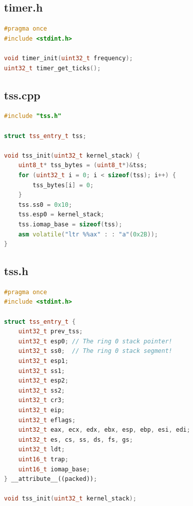 \documentclass[12pt,a4paper]{report}
\begin{document}
\subsection{timer.h}
\begin{lstlisting}[language={C++}]
#pragma once
#include <stdint.h>

void timer_init(uint32_t frequency);
uint32_t timer_get_ticks();
\end{lstlisting}

\subsection{tss.cpp}
\begin{lstlisting}[language={C++}]
#include "tss.h"

struct tss_entry_t tss;

void tss_init(uint32_t kernel_stack) {
    uint8_t* tss_bytes = (uint8_t*)&tss;
    for (uint32_t i = 0; i < sizeof(tss); i++) {
        tss_bytes[i] = 0;
    }
    tss.ss0 = 0x10;
    tss.esp0 = kernel_stack;
    tss.iomap_base = sizeof(tss);
    asm volatile("ltr %%ax" : : "a"(0x2B));
}

\end{lstlisting}

\subsection{tss.h}
\begin{lstlisting}[language={C++}]
#pragma once
#include <stdint.h>

struct tss_entry_t {
    uint32_t prev_tss;
    uint32_t esp0; // The ring 0 stack pointer!
    uint32_t ss0;  // The ring 0 stack segment!
    uint32_t esp1;
    uint32_t ss1;
    uint32_t esp2;
    uint32_t ss2;
    uint32_t cr3;
    uint32_t eip;
    uint32_t eflags;
    uint32_t eax, ecx, edx, ebx, esp, ebp, esi, edi;
    uint32_t es, cs, ss, ds, fs, gs;
    uint32_t ldt;
    uint16_t trap;
    uint16_t iomap_base;
} __attribute__((packed));

void tss_init(uint32_t kernel_stack);

\end{lstlisting}
\end{document}
